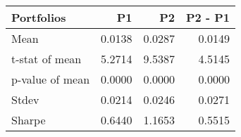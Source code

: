 \begin{tabular}{lrrr}
\toprule
Portfolios & P1 & P2 & P2 - P1 \\
\midrule
Mean & 0.0138 & 0.0287 & 0.0149 \\
t-stat of mean & 5.2714 & 9.5387 & 4.5145 \\
p-value of mean & 0.0000 & 0.0000 & 0.0000 \\
Stdev & 0.0214 & 0.0246 & 0.0271 \\
Sharpe & 0.6440 & 1.1653 & 0.5515 \\
\bottomrule
\end{tabular}
